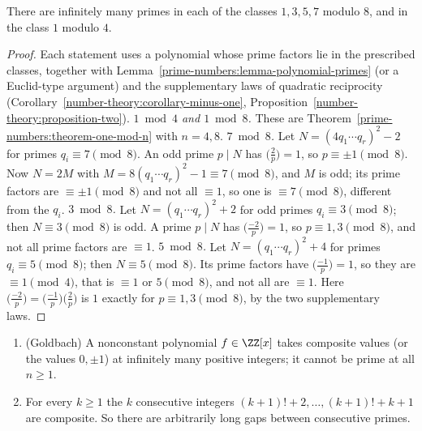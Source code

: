 \begin{proposition}\label{prime-numbers:proposition-classes-mod-eight}
There are infinitely many primes in each of the classes $1, 3, 5, 7$ modulo $8$, and in the class $1$ modulo $4$.
\end{proposition}

\begin{proof}
Each statement uses a polynomial whose prime factors lie in the prescribed classes, together with Lemma~\ref{prime-numbers:lemma-polynomial-primes} (or a Euclid-type argument) and the
supplementary laws of quadratic reciprocity (Corollary~\ref{number-theory:corollary-minus-one}, Proposition~\ref{number-theory:proposition-two}).
\emph{$1 \bmod 4$ and $1 \bmod 8$.} These are Theorem~\ref{prime-numbers:theorem-one-mod-n} with $n = 4, 8$.
\emph{$7 \bmod 8$.} Let $N = (4q_1 \cdots q_r)^2 - 2$ for primes $q_i \equiv 7 \pmod 8$. An odd prime $p \mid N$ has $\bigl(\frac{2}{p}\bigr) = 1$, so $p \equiv \pm 1 \pmod 8$. Now $N = 2M$ with
$M = 8(q_1 \cdots q_r)^2 - 1 \equiv 7 \pmod 8$, and $M$ is odd; its prime factors are $\equiv \pm 1 \pmod 8$ and not all $\equiv 1$, so one is $\equiv 7 \pmod 8$, different from the $q_i$.
\emph{$3 \bmod 8$.} Let $N = (q_1 \cdots q_r)^2 + 2$ for odd primes $q_i \equiv 3 \pmod 8$; then $N \equiv 3 \pmod 8$ is odd. A prime $p \mid N$ has $\bigl(\frac{-2}{p}\bigr) = 1$, so
$p \equiv 1, 3 \pmod 8$, and not all prime factors are $\equiv 1$.
\emph{$5 \bmod 8$.} Let $N = (q_1 \cdots q_r)^2 + 4$ for primes $q_i \equiv 5 \pmod 8$; then $N \equiv 5 \pmod 8$. Its prime factors have $\bigl(\frac{-1}{p}\bigr) = 1$, so they are $\equiv 1 \pmod 4$,
that is $\equiv 1$ or $5 \pmod 8$, and not all are $\equiv 1$.
Here $\bigl(\frac{-2}{p}\bigr) = \bigl(\frac{-1}{p}\bigr)\bigl(\frac{2}{p}\bigr)$ is $1$ exactly for $p \equiv 1, 3 \pmod 8$, by the two supplementary laws.
\end{proof}

\begin{proposition}\label{prime-numbers:proposition-composite-values}
\begin{enumerate}
\item (Goldbach) A nonconstant polynomial $f \in \ZZ[x]$ takes composite values (or the values $0, \pm 1$) at infinitely many positive integers; it cannot be prime at all $n \geq 1$.
\item For every $k \geq 1$ the $k$ consecutive integers $(k + 1)! + 2, \ldots, (k + 1)! + k + 1$ are composite. So there are arbitrarily long gaps between consecutive primes.
\end{enumerate}
\end{proposition}

